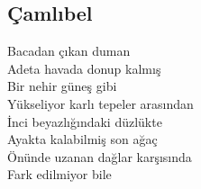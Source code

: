 \subsection{Çamlıbel}

Bacadan çıkan duman \\
Adeta havada donup kalmış \\
Bir nehir güneş gibi \\
Yükseliyor karlı tepeler arasından \\

\noindent\newline
İnci beyazlığındaki düzlükte \\
Ayakta kalabilmiş son ağaç \\
Önünde uzanan dağlar karşısında \\
Fark edilmiyor bile \\